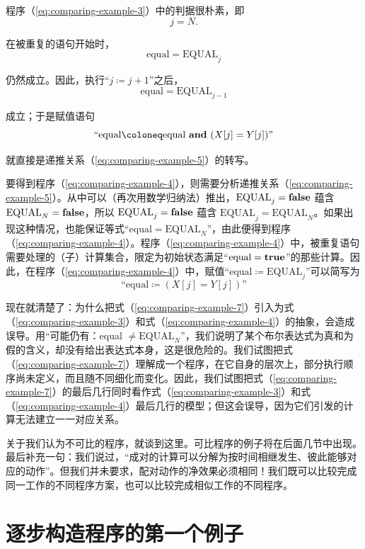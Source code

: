 程序（\ref{eq:comparing-example-3}）中的判据很朴素，即
$$
j = N.
$$

\noindent
在被重复的语句开始时，
$$
\text{equal} = \text{EQUAL}_j
$$

\noindent
仍然成立。因此，执行“$j \coloneq j + 1$”之后，
$$
\text{equal} = \text{EQUAL}_{j-1}
$$

\noindent
成立；于是赋值语句
$$
\text{``equal} \coloneq \text{equal \textbf{and} } (X[j] = Y[j])\text{''}
$$

\noindent
就直接是递推关系（\ref{eq:comparing-example-5}）的转写。

要得到程序（\ref{eq:comparing-example-4}），则需要分析递推关系（\ref{eq:comparing-example-5}）。从中可以（再次用数学归纳法）推出，$\text{EQUAL}_j = \text{\textbf{false}}$ 蕴含 $\text{EQUAL}_N = \text{\textbf{false}}$，所以 $\text{EQUAL}_j = \text{\textbf{false}}$ 蕴含 $\text{EQUAL}_j = \text{EQUAL}_N$。如果出现这种情况，也能保证等式“$\text{equal} = \text{EQUAL}_N$”，由此便得到程序（\ref{eq:comparing-example-4}）。程序（\ref{eq:comparing-example-4}）中，被重复语句需要处理的（子）计算集合，限定为初始状态满足“$\text{equal} = \text{\textbf{true}}$”的那些计算。因此，在程序（\ref{eq:comparing-example-4}）中，赋值“$\text{equal} \coloneq \text{EQUAL}_j$”可以简写为
$$
\text{``equal} \coloneq (X[j] = Y[j])\text{''}
$$

现在就清楚了：为什么把式（\ref{eq:comparing-example-7}）引入为式（\ref{eq:comparing-example-3}）和式（\ref{eq:comparing-example-4}）的抽象，会造成误导。用“可能仍有：equal $\neq \text{EQUAL}_N$”，我们说明了某个布尔表达式为真和为假的含义，却没有给出表达式本身，这是很危险的。我们试图把式（\ref{eq:comparing-example-7}）理解成一个程序，在它自身的层次上，部分执行顺序尚未定义，而且随不同细化而变化。因此，我们试图把式（\ref{eq:comparing-example-7}）的最后几行同时看作式（\ref{eq:comparing-example-3}）和式（\ref{eq:comparing-example-4}）最后几行的模型；但这会误导，因为它们引发的计算无法建立一一对应关系。

关于我们认为不可比的程序，就谈到这里。可比程序的例子将在后面几节中出现。最后补充一句：我们说过，“成对的计算可以分解为按时间相继发生、彼此能够对应的动作”。但我们并未要求，配对动作的净效果必须相同！我们既可以比较完成同一工作的不同程序方案，也可以比较完成相似工作的不同程序。

\section[逐步构造程序的第一个例子]{逐步构造程序的第一个例子}
\label{sec:first-example-step-wise-program-composition}

